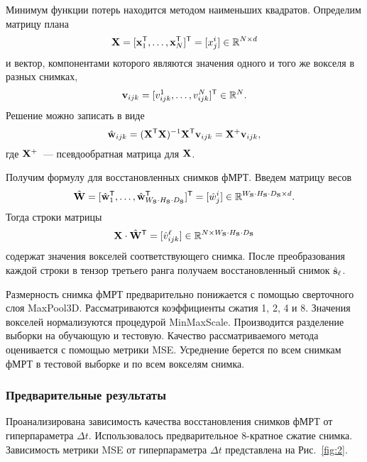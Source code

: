 \documentclass[a4paper, 12pt]{article}
\begin{document}
	Минимум функции потерь находится методом наименьших квадратов. Определим матрицу плана
	\begin{equation}
		\label{eq10}
		\mathbf{X} = [\mathbf{x}_1^{\mathsf{T}}, \ldots, \mathbf{x}_N^{\mathsf{T}}]^{\mathsf{T}} = [x^i_j] \in \mathbb{R}^{N \times d}
	\end{equation}
	и вектор, компонентами которого являются значения одного и того же вокселя в разных снимках,
	\begin{equation}
		\label{eq11}
		\mathbf{v}_{ijk} = [v^1_{ijk}, \ldots, v^N_{ijk}]^{\mathsf{T}} \in \mathbb{R}^N.
	\end{equation}
	Решение можно записать в виде
	\begin{equation}
		\label{eq12}
		\hat{\mathbf{w}}_{ijk} = (\mathbf{X}^{\mathsf{T}} \mathbf{X})^{-1} \mathbf{X}^{\mathsf{T}} \mathbf{v}_{ijk} = \mathbf{X}^{+} \mathbf{v}_{ijk},
	\end{equation}
	где $\mathbf{X}^{+}$~--- псевдообратная матрица для $\mathbf{X}$.
	
	Получим формулу для восстановленных снимков фМРТ. Введем матрицу весов
	\begin{equation}
		\label{eq13}
		\hat{\mathbf{W}} = [\hat{\mathbf{w}}_1^{\mathsf{T}}, \ldots, \hat{\mathbf{w}}_{W_{\mathbf{S}} \cdot H_{\mathbf{S}} \cdot D_{\mathbf{S}}}^{\mathsf{T}}]^{\mathsf{T}} = [\hat{w}^i_j] \in \mathbb{R}^{W_{\mathbf{S}} \cdot H_{\mathbf{S}} \cdot D_{\mathbf{S}} \times d}.
	\end{equation}
	Тогда строки матрицы
	\begin{equation}
		\label{eq14}
		\mathbf{X} \cdot \hat{\mathbf{W}}^{\mathsf{T}} = [\hat{v}^{\ell}_{ijk}] \in \mathbb{R}^{N \times W_{\mathbf{S}} \cdot H_{\mathbf{S}} \cdot D_{\mathbf{S}}}
	\end{equation}
	содержат значения вокселей соответствующего снимка. После преобразования каждой строки в тензор 
	третьего ранга получаем восстановленный снимок $\hat{\mathbf{s}}_{\ell}$.

	Размерность снимка фМРТ предварительно понижается с помощью сверточного слоя MaxPool3D.
	Рассматриваются коэффициенты сжатия 1, 2, 4 и 8.
	Значения вокселей нормализуются процедурой MinMaxScale.
	Производится разделение выборки на обучающую и тестовую.
	Качество рассматриваемого метода оценивается с помощью метрики MSE.
	Усреднение берется по всем снимкам фМРТ в тестовой выборке и по всем вокселям снимка.

\subsubsection{Предварительные результаты}

	Проанализирована зависимость качества восстановления снимков фМРТ от гиперпараметра $\Delta t$.
	Использовалось предварительное 8-кратное сжатие снимка.
	Зависимость метрики MSE от гиперпараметра $\Delta t$ представлена на Рис.~\ref{fig:2}.
\end{document}
